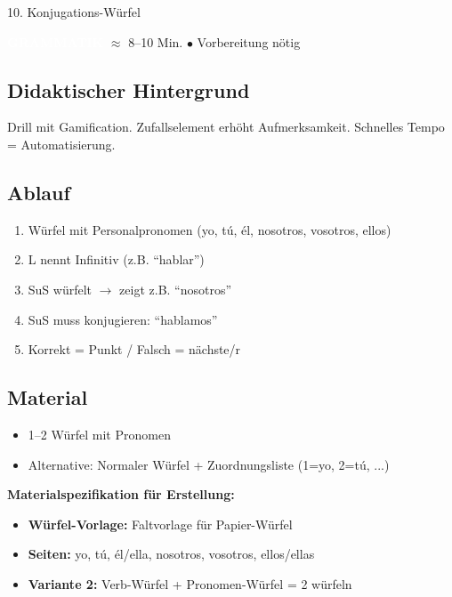\documentclass[11pt, a4paper]{article}
\newcommand{\tagGrammatik}{\colorbox{grammatik}{\textcolor{white}{\footnotesize\textbf{GRAMMATIK}}}}
\newcommand{\zeit}[1]{\textcolor{grau}{\footnotesize $\approx$ #1 Min.}}
\newcommand{\matVorbereitung}{\textcolor{akzent}{$\bullet$ Vorbereitung nötig}}
\begin{document}
\vspace{1em}

\begin{methode}{10. Konjugations-Würfel}

\tagGrammatik{} \zeit{8--10} \hfill \matVorbereitung

\subsection*{Didaktischer Hintergrund}
Drill mit Gamification. Zufallselement erhöht Aufmerksamkeit. Schnelles Tempo = Automatisierung.

\subsection*{Ablauf}
\begin{enumerate}[leftmargin=*]
    \item Würfel mit Personalpronomen (yo, tú, él, nosotros, vosotros, ellos)
    \item L nennt Infinitiv (z.B. ``hablar'')
    \item SuS würfelt $\rightarrow$ zeigt z.B. ``nosotros''
    \item SuS muss konjugieren: ``hablamos''
    \item Korrekt = Punkt / Falsch = nächste/r
\end{enumerate}

\subsection*{Material}
\begin{materialbox}
\begin{itemize}[label=$\square$, leftmargin=*]
    \item 1--2 Würfel mit Pronomen
    \item Alternative: Normaler Würfel + Zuordnungsliste (1=yo, 2=tú, ...)
\end{itemize}

\textbf{Materialspezifikation für Erstellung:}
\begin{itemize}[leftmargin=*]
    \item \textbf{Würfel-Vorlage:} Faltvorlage für Papier-Würfel
    \item \textbf{Seiten:} yo, tú, él/ella, nosotros, vosotros, ellos/ellas
    \item \textbf{Variante 2:} Verb-Würfel + Pronomen-Würfel = 2 würfeln
\end{itemize}
\end{materialbox}

\end{methode}
\end{document}

